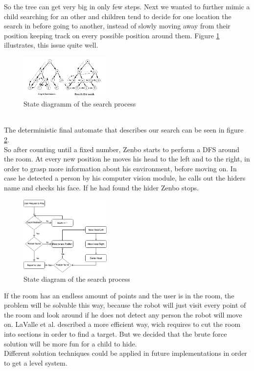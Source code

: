 \documentclass[conference]{IEEEtran}
\begin{document}
So the tree can get very big in only few steps. Next we wanted to further mimic a child searching for an other and
children tend to decide for one location the search in before going to another, 
instead of slowly moving away from their position keeping track on every possible position around them.
Figure \ref{fig:dfs_vsbfs} illustrates, this issue quite well.
\begin{figure}[h]  \label{fig:dfs_vsbfs}
	\begin{center}
		\includegraphics[width=0.4\textwidth]{pics/DFS_VS_BFS.png}
	\end{center}
	\caption{State diagramm of the search process}
\end{figure}\\
The deterministic final automate that describes our search can be seen in figure \ref{fig:zenboSeek}. \\
So after counting until a fixed number, Zenbo starts to perform a DFS around the room.
At every new position he moves his head to the left and to the right, in order to grasp more information about his environment, before moving on. In case he detected a person by 
his computer vision module, he calls out the hiders name and checks his face. If he had found the hider Zenbo stops.
\begin{figure}[h]  \label{fig:zenboSeek}
	\begin{center}
		\includegraphics[width=0.4\textwidth]{pics/ZenboSeek.png}
	\end{center}
	\caption{State diagram of the search process}
\end{figure}
If the room has an endless amount of points and the user is in the room, 
the problem will be solvable this way, because the robot will just visit every point of the room and look around
if he does not detect any person the robot will move on.
LaValle et al. \cite{b3} described a more efficient way, wich requires to cut the room into sections in order to find a target.
But we decided that the brute force solution will be more fun for a child to hide.\\
Different solution techniques could be applied in future implementations in order to get a level system.
\end{document}
